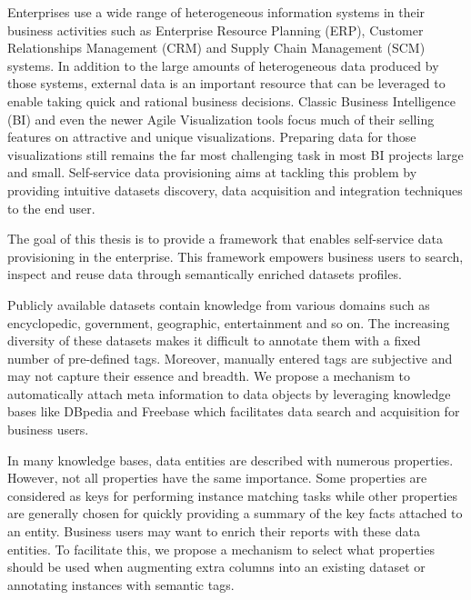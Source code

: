 Enterprises use a wide range of heterogeneous information systems in their business activities such as Enterprise Resource Planning (ERP), Customer Relationships Management (CRM) and Supply Chain Management (SCM) systems. In addition to the large amounts of heterogeneous data produced by those systems, external data is an important resource that can be leveraged to enable taking quick and rational business decisions.
Classic Business Intelligence (BI) and even the newer Agile Visualization tools focus much of their selling features on attractive and unique visualizations. Preparing data for those visualizations still remains the far most challenging task in most BI projects large and small. Self-service data provisioning aims at tackling this problem by providing intuitive datasets discovery, data acquisition and integration techniques to the end user.

The goal of this thesis is to provide a framework that enables self-service data provisioning in the enterprise. This framework empowers business users to search, inspect and reuse data through semantically enriched datasets profiles.

Publicly available datasets contain knowledge from various domains such as encyclopedic, government, geographic, entertainment and so on. The increasing diversity of these datasets makes it difficult to annotate them with a fixed number of pre-defined tags. Moreover, manually entered tags are subjective and may not capture their essence and breadth. We propose a mechanism to automatically attach meta information to data objects by leveraging knowledge bases like DBpedia and Freebase which facilitates data search and acquisition for business users.

In many knowledge bases, data entities are described with numerous properties. However, not all properties have the same importance. Some properties are considered as keys for performing instance matching tasks while other properties are generally chosen for quickly providing a summary of the key facts attached to an entity.
Business users may want to enrich their reports with these data entities. To facilitate this, we propose a mechanism to select what properties should be used when augmenting extra columns into an existing dataset or annotating instances with semantic tags.

